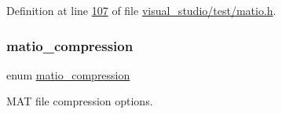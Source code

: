Definition at line \hyperlink{visual__studio_2test_2matio_8h_source_l00107}{107} of file \hyperlink{visual__studio_2test_2matio_8h_source}{visual\+\_\+studio/test/matio.\+h}.

\mbox{\label{group___m_a_t_ga768c318af97bd2567758ecb001ceb7f4}} 
\subsubsection{\texorpdfstring{matio\+\_\+compression}{matio\_compression}\hspace{0.1cm}{\footnotesize\ttfamily [1/2]}}
{\footnotesize\ttfamily enum \hyperlink{group___m_a_t_ga768c318af97bd2567758ecb001ceb7f4}{matio\+\_\+compression}}



M\+AT file compression options. 

